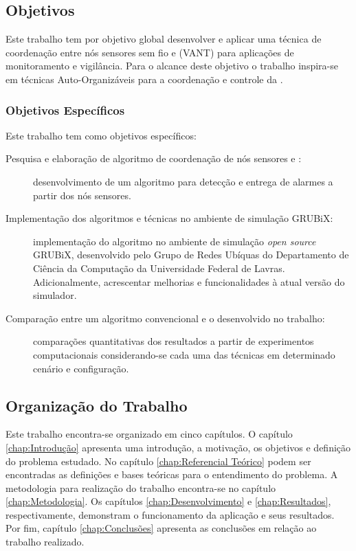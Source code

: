 \subsection{Objetivos}

Este trabalho tem por objetivo global desenvolver e aplicar uma técnica de
coordenação entre nós sensores sem fio e \uavs (VANT) para aplicações de monitoramento
e vigilância. Para o alcance deste objetivo o trabalho inspira-se em técnicas
Auto-Organizáveis para a coordenação e controle da \rssf.

\subsubsection{Objetivos Específicos}

Este trabalho tem como objetivos específicos:

\begin{description}

	\item [Pesquisa e elaboração de algoritmo de coordenação de nós
sensores e \vants:] desenvolvimento de um algoritmo para detecção e entrega de
alarmes a partir dos nós sensores.

	\item [Implementação dos algoritmos e técnicas no ambiente de simulação
GRUBiX:] implementação do algoritmo no ambiente de simulação
\emph{open source} GRUBiX, desenvolvido pelo Grupo de Redes Ubíquas do
Departamento de Ciência da Computação da Universidade Federal de Lavras.
Adicionalmente, acrescentar melhorias e funcionalidades à atual versão do
simulador.

	\item [Comparação entre um algoritmo convencional e o desenvolvido no
trabalho:] comparações quantitativas dos resultados a partir de experimentos
computacionais considerando-se cada uma das técnicas em determinado cenário e configuração.

\end{description}

%
\subsection{Organização do Trabalho}

Este trabalho encontra-se organizado em cinco capítulos. O capítulo
\ref{chap:Introdução} apresenta uma introdução, a motivação, os objetivos e
definição do problema estudado. No capítulo \ref{chap:Referencial Teórico} podem
ser encontradas as definições e bases teóricas para o entendimento do problema.
A metodologia para realização do trabalho encontra-se no capítulo
\ref{chap:Metodologia}. Os capítulos \ref{chap:Desenvolvimento} e
\ref{chap:Resultados}, respectivamente, demonstram o funcionamento da aplicação e seus resultados. Por fim, capítulo \ref{chap:Conclusões} apresenta as conclusões em relação ao trabalho realizado.


